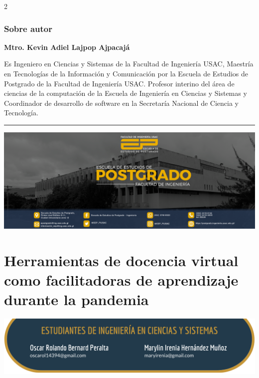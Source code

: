\documentclass[12pt,spanish,Letterpaper,openany]{book}
\newcommand{\HRule}{\begin{center}\rule{0.5\linewidth}{0.2mm}\end{center}}
\begin{document}
\begin {multicols}{2}
\hypertarget{sobre-autor}{%
\subsection{Sobre autor}\label{sobre-autor}}

\textbf{Mtro. Kevin Adiel Lajpop Ajpacajá}

Es Ingeniero en Ciencias y Sistemas de la Facultad de Ingeniería USAC, Maestría en Tecnologías de la Información y Comunicación por la Escuela de Estudios de Postgrado de la Facultad de Ingeniería USAC. Profesor interino del área de ciencias de la computación de la Escuela de Ingeniería en Ciencias y Sistemas y Coordinador de desarrollo de software en la Secretaría Nacional de Ciencia y Tecnología.

\end {multicols}
\medskip
\HRule
\medskip

\begin{center}\includegraphics[width=1\linewidth]{images/publicidad17} \end{center}

\hypertarget{pareja33}{%
\chapter{Herramientas de docencia virtual como facilitadoras de aprendizaje durante la pandemia}\label{pareja33}}

\begin{center}\includegraphics[width=1\linewidth]{images/pareja33_image1} \end{center}
\end{document}
